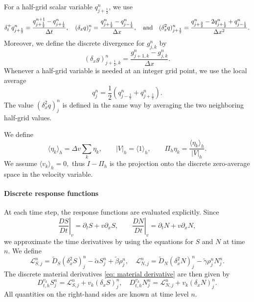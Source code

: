 \documentclass[11pt,twoside]{article}
\numberwithin{equation}{section}
\theoremstyle{plain}
\theoremstyle{nonumberplain}
\begin{document}
{{For a half-grid scalar variable \(q_{j+\frac12}^n\), we use
\[
\delta_t^+ q_{j+\frac12}^n
=
\frac{q_{j+\frac12}^{n+1}-q_{j+\frac12}^n}{\Delta t},
\ \ \
(\delta_x q)_j^n
=
\frac{q_{j+\frac12}^n-q_{j-\frac12}^n}{\Delta x},\ \ \ \textnormal{and}\ \ \
(\delta_x^2 q)_{j+\frac12}^n
=
\frac{
q_{j+\frac32}^n
-2q_{j+\frac12}^n
+q_{j-\frac12}^n
}{\Delta x^2}.
\]
Moreover, we define the discrete divergence for \(g_{j,k}^n\) by
\[
(\delta_x g)_{j+\frac12,k}^n
=
\frac{g_{j+1,k}^n-g_{j,k}^n}{\Delta x}.
\]
Whenever a half-grid variable is needed at an integer grid point, we use
the local average
\[
q_j^n=\frac12\left(q_{j-\frac12}^n+q_{j+\frac12}^n\right).
\]
The value \((\delta_x^2 q)_j^n\) is defined in the same way by averaging
the two neighboring half-grid values.

 We define
\[
\langle \eta_k\rangle_h=\Delta v\sum_k \eta_k,
\qquad
|V|_h=\langle 1\rangle_h,
\qquad
\Pi_h\eta_k=\frac{\langle \eta_k\rangle_h}{|V|_h}.
\]
We assume
$\langle v_k\rangle_h=0,$
thus \(I-\Pi_h\) is the projection onto the discrete zero-average space in
the velocity variable.

\paragraph{Discrete response functions}

At each time step, the response functions are evaluated explicitly. Since
\begin{equation}\label{eq: material derivative}
\left.\frac{DS}{Dt}\right|_v=\partial_t S+v\partial_x S,
\qquad
\left.\frac{DN}{Dt}\right|_v =\partial_t N+v\partial_x N,
\end{equation}
we approximate the time derivatives by using the equations for \(S\) and
\(N\) at time \(n\). We define
\[
\mathcal L_{S,j}^n
=
\widetilde D_S(\delta_x^2 S)_j^n
-\widetilde\alpha S_j^n
+\widetilde\beta \rho_j^n,
\quad 
\mathcal L_{N,j}^n
=
\widetilde D_N(\delta_x^2 N)_j^n
-\widetilde\gamma \rho_j^n N_j^n .
\]
The discrete material derivatives \eqref{eq: material derivative} are then given by
\[
D_{t,h}^{v_k}S_j^n
=
\mathcal L_{S,j}^n
+
v_k(\delta_x S)_j^n,
\quad 
D_{t,h}^{v_k}N_j^n
=
\mathcal L_{N,j}^n
+
v_k(\delta_x N)_j^n .
\]
All quantities on the right-hand sides are known at time level \(n\).

}}
\end{document}
